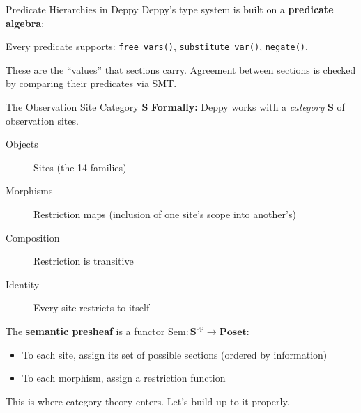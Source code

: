 \documentclass[aspectratio=169,10pt]{beamer}
\newcommand{\Sem}{\mathrm{Sem}}
\newcommand{\op}{\mathrm{op}}
\newcommand{\Poset}{\mathbf{Poset}}
\begin{document}
\begin{frame}{Predicate Hierarchies in Deppy}
Deppy's type system is built on a \textbf{predicate algebra}:

\begin{center}
\end{center}

Every predicate supports: \texttt{free\_vars()}, \texttt{substitute\_var()}, \texttt{negate()}.

These are the ``values'' that sections carry. Agreement between sections is checked by comparing their predicates via SMT.
\end{frame}

\begin{frame}{The Observation Site Category $\mathbf{S}$}
\textbf{Formally:} Deppy works with a \emph{category} $\mathbf{S}$ of observation sites.

\begin{description}
  \item[Objects] Sites (the 14 families)
  \item[Morphisms] Restriction maps (inclusion of one site's scope into another's)
  \item[Composition] Restriction is transitive
  \item[Identity] Every site restricts to itself
\end{description}

\vspace{0.3em}
The \textbf{semantic presheaf} is a functor $\Sem : \mathbf{S}^{\op} \to \Poset$:
\begin{itemize}
  \item To each site, assign its set of possible sections (ordered by information)
  \item To each morphism, assign a restriction function
\end{itemize}

This is where category theory enters. Let's build up to it properly.
\end{frame}
\end{document}
